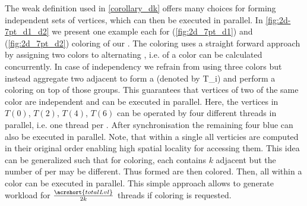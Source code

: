  The weak definition used in \cref{corollary_dk} offers many choices for forming \DK independent sets of vertices, which can then be executed in parallel. 
 In  \cref{fig:2d-7pt_d1_d2} we present one example each for \DONE (\cref{fig:2d_7pt_d1}) and \DTWO (\cref{fig:2d_7pt_d2}) coloring of our \stex. The \DONE coloring uses a straight forward approach by assigning two colors to alternating \levels, i.e. \levels of a color can be calculated concurrently. In case of \DTWO independency we refrain from using three colors but instead aggregate two adjacent \levels to form a \textit{\levelGroup} (denoted by \acrshort{T_i}) and perform a \DONE coloring on top of those groups. This guarantees that vertices of two \levelGroups of the same color are \DTWO independent and can be executed in parallel. Here, the vertices in $T(0)$, $T(2)$, $T(4)$, $T(6)$ can be operated by four different threads in parallel, i.e. one thread per \levelGroup.  After synchronisation the remaining four blue \levelGroups can also be executed in parallel. Note, that within a single \levelGroup all verticies are computed in their original order enabling high spatial locality for accessing them. This idea can be generalized such that for \DK coloring, each \levelGroup contains \atleast $k$ adjacent \levels but the number of \levels per \levelGroup may be different. Thus formed \levelGroups are then \DONE colored. Then, all \levelGroups within a color can be executed in parallel. This simple approach allows to generate workload for $\frac{\acrshort{totalLvl}}{2 k}$ threads if \DK coloring is requested.
 
